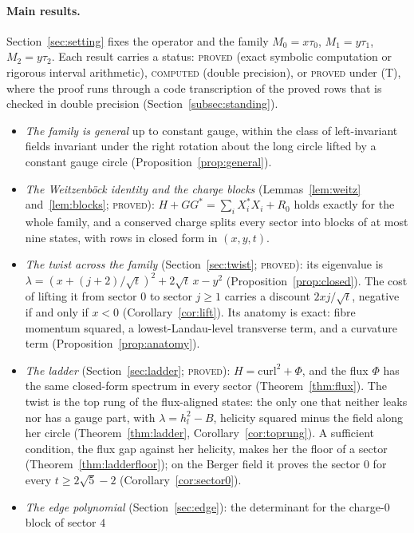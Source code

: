 \documentclass[11pt]{article}
\theoremstyle{definition}
\theoremstyle{remark}
\newcommand{\PROVED}{\textsc{proved}}
\newcommand{\COMPUTED}{\textsc{computed}}
\newcommand{\PROVEDT}{\textsc{proved} under (T)}
\begin{document}
\paragraph{Main results.} Section~\ref{sec:setting} fixes the operator and the family $M_0=x\tau_0$, $M_1=y\tau_1$,
$M_2=y\tau_2$. Each result carries a status: \PROVED{} (exact symbolic computation or rigorous interval arithmetic),
\COMPUTED{} (double precision), or \PROVEDT{}, where the proof runs through a code transcription of the proved rows
that is checked in double precision (Section~\ref{subsec:standing}).
\begin{itemize}
  \item \emph{The family is general} up to constant gauge, within the class of left-invariant fields invariant under
    the right rotation about the long circle lifted by a constant gauge circle (Proposition~\ref{prop:general}).
  \item \emph{The Weitzenb\"ock identity and the charge blocks} (Lemmas~\ref{lem:weitz} and~\ref{lem:blocks};
    \PROVED): $H+GG^*=\sum_iX_i^*X_i+R_0$ holds exactly for the whole family, and a conserved charge splits every sector
    into blocks of at most nine states, with rows in closed form in $(x,y,t)$.
  \item \emph{The twist across the family} (Section~\ref{sec:twist}; \PROVED): its eigenvalue is
    $\lambda=(x+(j+2)/\sqrt t)^2+2\sqrt t\,x-y^2$ (Proposition~\ref{prop:closed}). The cost of lifting it from sector
    $0$ to sector $j\ge1$ carries a discount $2xj/\sqrt t$, negative if and only if $x<0$ (Corollary~\ref{cor:lift}).
    Its anatomy is exact: fibre momentum squared, a lowest-Landau-level transverse term, and a curvature term
    (Proposition~\ref{prop:anatomy}).
  \item \emph{The ladder} (Section~\ref{sec:ladder}; \PROVED): $H=\mathrm{curl}^2+\Phi$, and the flux $\Phi$ has the
    same closed-form spectrum in every sector (Theorem~\ref{thm:flux}). The twist is the top rung of the flux-aligned
    states: the only one that neither leaks nor has a gauge part, with $\lambda=h_l^2-B$, helicity squared minus the
    field along her circle (Theorem~\ref{thm:ladder}, Corollary~\ref{cor:toprung}). A sufficient condition, the flux
    gap against her helicity, makes her the floor of a sector (Theorem~\ref{thm:ladderfloor}); on the Berger field it
    proves the sector $0$ for every $t\ge2\sqrt5-2$ (Corollary~\ref{cor:sector0}).
  \item \emph{The edge polynomial} (Section~\ref{sec:edge}): the determinant for the charge-$0$ block of sector $4$

\end{itemize}
\end{document}
